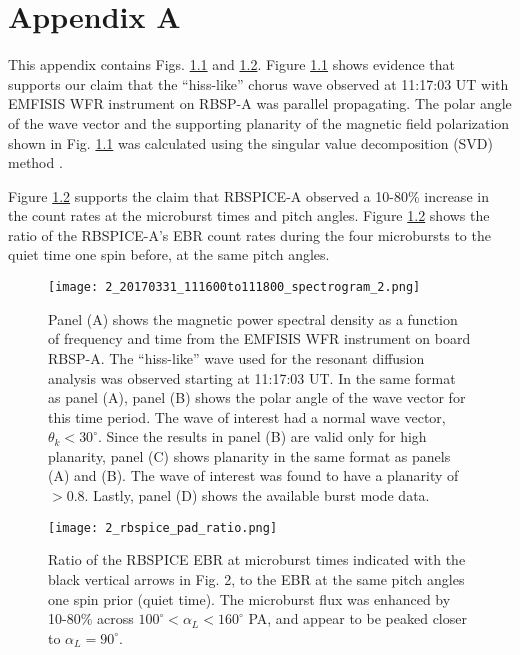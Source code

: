 \chapter{Appendix A}\label{appendixa}

This appendix contains Figs. \ref{B1} and \ref{B2}. Figure \ref{B1} shows evidence that supports our claim that the ``hiss-like'' chorus wave observed at 11:17:03 UT with EMFISIS WFR instrument on RBSP-A was parallel propagating. The polar angle of the wave vector and the supporting planarity of the magnetic field polarization shown in Fig. \ref{B1} was calculated using the singular value decomposition (SVD) method \citep{Santolik2003SVD}.

Figure \ref{B2} supports the claim that RBSPICE-A observed a 10-80\% increase in the count rates at the microburst times and pitch angles. Figure \ref{B2} shows the ratio of the RBSPICE-A's EBR count rates during the four microbursts to the quiet time one spin before, at the same pitch angles.

\begin{figure}
\noindent\texttt{[image: 2\_20170331\_111600to111800\_spectrogram\_2.png]}
\caption{Panel (A) shows the magnetic power spectral density as a function of frequency and time from the EMFISIS WFR instrument on board RBSP-A. The ``hiss-like'' wave used for the resonant diffusion analysis was observed starting at 11:17:03 UT. In the same format as panel (A), panel (B) shows the polar angle of the wave vector for this time period. The wave of interest had a normal wave vector, $\theta_k < 30^\circ$. Since the results in panel (B) are valid only for high planarity, panel (C) shows planarity in the same format as panels (A) and (B). The wave of interest was found to have a planarity of $> 0.8$. Lastly, panel (D) shows the available burst mode data.}
\label{B1}
\end{figure}

\begin{figure}
\noindent\texttt{[image: 2\_rbspice\_pad\_ratio.png]}
\caption{Ratio of the RBSPICE EBR at microburst times indicated with the black vertical arrows in Fig. 2, to the EBR at the same pitch angles one spin prior (quiet time). The microburst flux was enhanced by 10-80\% across $100^\circ < \alpha_L < 160^\circ$ PA, and appear to be peaked closer to $\alpha_L = 90^\circ$.}
\label{B2}
\end{figure}